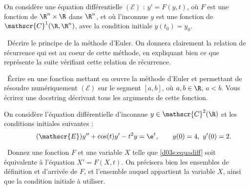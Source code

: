 On considère une équation différentielle $(\mathscr{E})$ : $y' = F(y,t)$, où $F$ est une fonction de $\R^n \times \R$ dans 
$\R^n$, et où l'inconnue $y$ est une fonction de $\mathscr{C}^1(\R,\R^n)$, avec la condition initiale $y(t_0) = y_0$.

\medskip

\question\ Décrire le principe de la méthode d'Euler. On donnera clairement la relation de récurrence qui est au coeur de 
cette méthode, en expliquant bien ce que représente la suite vérifiant cette relation de récurrence.

\medskip 

\question\ Écrire en \python{} une fonction mettant en \oe uvre la méthode d'Euler  et permettant de résoudre numériquement $(\mathscr{E})$ sur le segment 
$[a,b]$, 
où $a,b\in\R$, $a<b$. Vous écrirez une docstring décrivant tous les arguments de cette fonction.

\medskip

On considère l'équation différentielle d'inconnue $y\in\mathscr{C}^2(\R)$ et les conditions initiales suivantes : 
\begin{equation}\tag{$\mathscr{E}$}\label{d03s:equadiff}
  y''+\cos(t) y' - t^2 y = \e^t,\qquad y(0) = 4,~ y'(0) = 2. 
\end{equation}

\question\ Donnez une fonction $F$ et une variable $X$ telle que \eqref{d03s:equadiff} soit équivalente à l'équation $X'=F(X,t)$. On précisera bien 
les ensembles de définition et d'arrivée de $F$, et l'ensemble auquel appartient la variable $X$, ainsi que la condition initiale à utiliser.